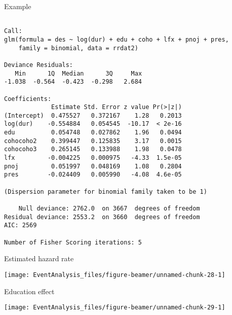 \documentclass[10pt,ignorenonframetext,]{beamer}
\begin{document}
\begin{frame}[fragile]{Example}

\scriptsize

\begin{verbatim}

Call:
glm(formula = des ~ log(dur) + edu + coho + lfx + pnoj + pres, 
    family = binomial, data = rrdat2)

Deviance Residuals: 
   Min      1Q  Median      3Q     Max  
-1.038  -0.564  -0.423  -0.298   2.684  

Coefficients:
             Estimate Std. Error z value Pr(>|z|)
(Intercept)  0.475527   0.372167    1.28   0.2013
log(dur)    -0.554884   0.054545  -10.17  < 2e-16
edu          0.054748   0.027862    1.96   0.0494
cohocoho2    0.399447   0.125835    3.17   0.0015
cohocoho3    0.265145   0.133988    1.98   0.0478
lfx         -0.004225   0.000975   -4.33  1.5e-05
pnoj         0.051997   0.048169    1.08   0.2804
pres        -0.024409   0.005990   -4.08  4.6e-05

(Dispersion parameter for binomial family taken to be 1)

    Null deviance: 2762.0  on 3667  degrees of freedom
Residual deviance: 2553.2  on 3660  degrees of freedom
AIC: 2569

Number of Fisher Scoring iterations: 5
\end{verbatim}

\end{frame}

\begin{frame}{Estimated hazard rate}

\begin{center}\texttt{[image: EventAnalysis\_files/figure-beamer/unnamed-chunk-28-1]} \end{center}

\end{frame}

\begin{frame}{Education effect}

\begin{center}\texttt{[image: EventAnalysis\_files/figure-beamer/unnamed-chunk-29-1]} \end{center}

\end{frame}
\end{document}
